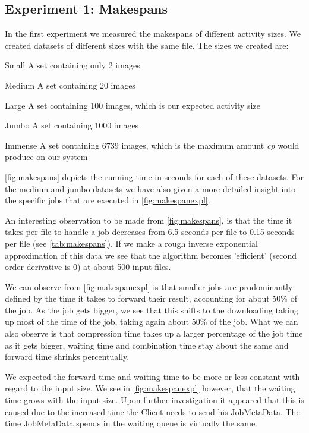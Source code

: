 \documentclass[twocolumn,twoside]{IEEEtran}
\begin{document}
\subsection{Experiment 1: Makespans}
In the first experiment we measured the makespans of 
different activity sizes. We created datasets of different
sizes with the same file. The sizes we created are:
\begin{LaTeXdescription}
\item[Small] A set containing only 2 images
\item[Medium] A set containing 20 images
\item[Large] A set containing 100 images, which is our expected activity size
\item[Jumbo] A set containing 1000 images
\item[Immense] A set containing 6739 images, which is the maximum amount \emph{cp} would produce on our system
\end{LaTeXdescription}
\autoref{fig:makespans} depicts the running time in seconds 
for each of these datasets. For the medium and jumbo datasets
we have also given a more detailed insight into the specific
jobs that are executed in \autoref{fig:makespanexpl}.

An interesting observation to be made from \autoref{fig:makespans},
is that the time it takes per file to handle a job decreases from
6.5 seconds per file to 0.15 seconds per file (see \autoref{tab:makespans}). If we make a rough
inverse exponential approximation of this data we see that the algorithm
becomes 'efficient' (second order derivative is 0) at about 500 input files.

We can observe from \autoref{fig:makespanexpl} is that smaller jobs
are prodominantly defined by the time it takes to forward their
result, accounting for about 50\% of the job. As the job gets
bigger, we see that this shifts to the downloading taking up
most of the time of the job, taking again about 50\% of the job.
What we can also observe is that compression time takes up
a larger percentage of the job time as it gets bigger, waiting
time and combination time stay about the same and forward time shrinks percentually.

We expected the forward time and waiting time to be more or less constant
with regard to the input size. We see in \autoref{fig:makespanexpl} however,
that the waiting time grows with the input size. Upon further investigation
it appeared that this is caused due to the increased time the Client
needs to send his JobMetaData. The time JobMetaData spends in the waiting
queue is virtually the same.
\end{document}
